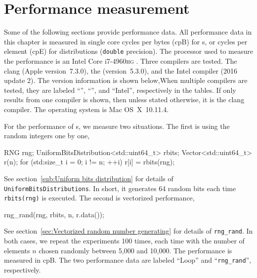 \section{Performance measurement}
\label{sec:Performance measurement}

Some of the following sections provide performance data. All performance data
in this chapter is measured in single core cycles per bytes (cpB) for \rng{}s,
or cycles per element (cpE) for distributions (\verb|double| precision). The
processor used to measure the performance is an Intel Core i7-4960\textsc{hg}
\cpu. Three compilers are tested. The \llvm clang (Apple version~7.3.0), the
\gnu{} \gcc (version~5.3.0), and the Intel \cpp compiler (2016 update 2). The
version information is shown below,When multiple compilers are tested, they are
labeled ``\llvm'', ``\gnu'', and ``Intel'', respectively in the tables. If only
results from one compiler is shown, then unless stated otherwise, it is the
\llvm clang compiler. The operating system is Mac OS~X~10.11.4.

For the performance of \rng{}s, we measure two situations. The first is
using the random integers one by one,
\begin{cppcode}
  RNG rng;
  UniformBitsDistribution<std::uint64_t> rbits;
  Vector<std::uint64_t> r(n);
  for (std:size_t i = 0; i != n; ++i)
      r[i] = rbits(rng);
\end{cppcode}
See section~\ref{sub:Uniform bits distribution} for details of
\verb|UniformBitsDistributions|. In short, it generates 64 random bits each
time \verb|rbits(rng)| is executed. The second is vectorized performance,
\begin{cppcode}
  rng_rand(rng, rbits, n, r.data());
\end{cppcode}
See section~\ref{sec:Vectorized random number generating} for details of
\verb|rng_rand|. In both cases, we repeat the experiments 100 times, each time
with the number of elements $n$ chosen randomly between 5,000 and 10,000. The
performance is measured in cpB. The two performance data are labeled ``Loop''
and ``\verb|rng_rand|'', respectively.

